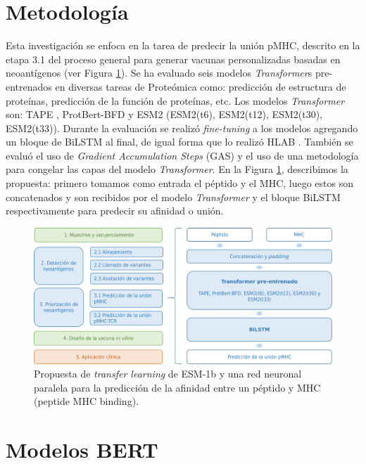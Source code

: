 \section{Metodología}

Esta investigación se  enfoca en la tarea de predecir la unión pMHC, descrito en la etapa 3.1 del proceso general para generar vacunas personalizadas basadas en neoantígenos (ver Figura \ref{fig:proposal}). Se ha evaluado  seis modelos \textit{Transformer}s pre-entrenados en diversas tareas de Proteómica como: predicción de estructura de proteínas, predicción de la función de proteínas, etc. Los modelos \textit{Transformer} son: TAPE \citep{rao2019evaluating}, ProtBert-BFD \citep{elnaggar2021prottrans} y ESM2 \citep{lin2023evolutionary} (ESM2(t6), ESM2(t12), ESM2(t30), ESM2(t33)). Durante la evaluación se realizó \textit{fine-tuning} a los modelos agregando un bloque de BiLSTM al final, de igual forma que lo realizó HLAB \citep{zhang2022hlab}. También se evaluó el uso de \textit{Gradient Accumulation Steps} (GAS) y el uso de una metodología para congelar las capas del modelo \textit{Transformer}. En la Figura \ref{fig:proposal}, describimos la propuesta: primero tomamos como entrada el péptido y el MHC, luego estos son concatenados y son recibidos por el modelo \textit{Transformer} y el bloque BiLSTM respectivamente para predecir su afinidad o unión.




\begin{figure}[H]
	\centering
	\includegraphics[width=\textwidth]{img/proposal/proposal}	
	\caption{Propuesta de \textit{transfer learning} de ESM-1b y una red neuronal paralela para la predicción de la afinidad entre un péptido y MHC (peptide MHC binding).}
	\label{fig:proposal}
\end{figure}





\section{Modelos BERT}

